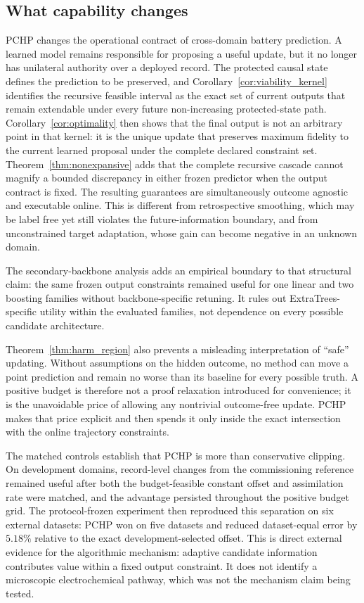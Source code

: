\documentclass[preprint,12pt]{elsarticle}
\begin{document}
\subsection{What capability changes}

PCHP changes the operational contract of cross-domain battery prediction. A learned model remains responsible for proposing a useful update, but it no longer has unilateral authority over a deployed record. The protected causal state defines the prediction to be preserved, and Corollary~\ref{cor:viability_kernel} identifies the recursive feasible interval as the exact set of current outputs that remain extendable under every future non-increasing protected-state path. Corollary~\ref{cor:optimality} then shows that the final output is not an arbitrary point in that kernel: it is the unique update that preserves maximum fidelity to the current learned proposal under the complete declared constraint set. Theorem~\ref{thm:nonexpansive} adds that the complete recursive cascade cannot magnify a bounded discrepancy in either frozen predictor when the output contract is fixed. The resulting guarantees are simultaneously outcome agnostic and executable online. This is different from retrospective smoothing, which may be label free yet still violates the future-information boundary, and from unconstrained target adaptation, whose gain can become negative in an unknown domain.

The secondary-backbone analysis adds an empirical boundary to that structural claim: the same frozen output constraints remained useful for one linear and two boosting families without backbone-specific retuning. It rules out ExtraTrees-specific utility within the evaluated families, not dependence on every possible candidate architecture.

Theorem~\ref{thm:harm_region} also prevents a misleading interpretation of ``safe'' updating. Without assumptions on the hidden outcome, no method can move a point prediction and remain no worse than its baseline for every possible truth. A positive budget is therefore not a proof relaxation introduced for convenience; it is the unavoidable price of allowing any nontrivial outcome-free update. PCHP makes that price explicit and then spends it only inside the exact intersection with the online trajectory constraints.

The matched controls establish that PCHP is more than conservative clipping. On development domains, record-level changes from the commissioning reference remained useful after both the budget-feasible constant offset and assimilation rate were matched, and the advantage persisted throughout the positive budget grid. The protocol-frozen experiment then reproduced this separation on six external datasets: PCHP won on five datasets and reduced dataset-equal error by $5.18\%$ relative to the exact development-selected offset. This is direct external evidence for the algorithmic mechanism: adaptive candidate information contributes value within a fixed output constraint. It does not identify a microscopic electrochemical pathway, which was not the mechanism claim being tested.
\end{document}

